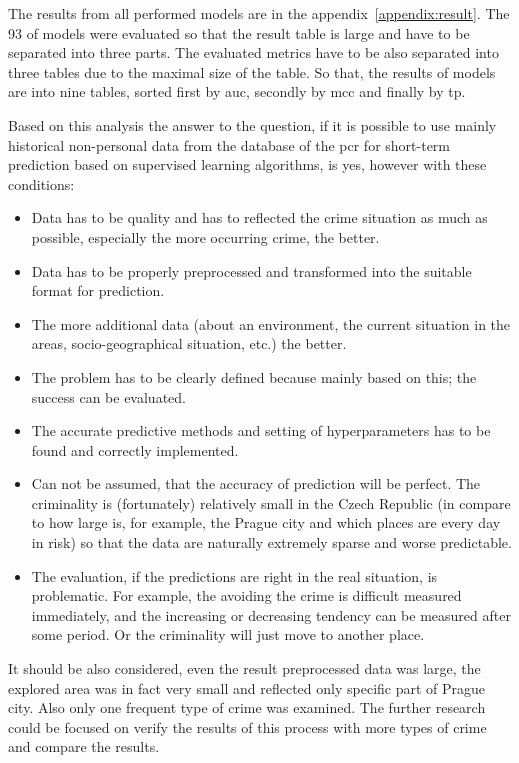 \documentclass[thesis=M,english]{FITthesis}[2012/10/20]
\begin{document}
The results from all performed models are in the appendix~\ref{appendix:result}. The 93 of models were evaluated so that the result table is large and have to be separated into three parts. The evaluated metrics have to be also separated into three tables due to the maximal size of the table. So that, the results of models are into nine tables, sorted first by \gls{auc}, secondly by \gls{mcc} and finally by \gls{tp}. 

Based on this analysis the answer to the question, if it is possible to use mainly historical non-personal data from the database of the \gls{pcr} for short-term prediction based on supervised learning algorithms, is yes, however with these conditions:

\begin{itemize}
    \item Data has to be quality and has to reflected the crime situation as much as possible, especially the more occurring crime, the better.
    \item Data has to be properly preprocessed and transformed into the suitable format for prediction.
    \item The more additional data (about an environment, the current situation in the areas, socio-geographical situation, etc.) the better.
    \item The problem has to be clearly defined because mainly based on this; the success can be evaluated.
    \item The accurate predictive methods and setting of hyperparameters has to be found and correctly implemented.
    \item Can not be assumed, that the accuracy of prediction will be perfect. The criminality is (fortunately) relatively small in the Czech Republic (in compare to how large is, for example, the Prague city and which places are every day in risk) so that the data are naturally extremely sparse and worse predictable.
    \item The evaluation, if the predictions are right in the real situation, is problematic. For example, the avoiding the crime is difficult measured immediately, and the increasing or decreasing tendency can be measured after some period. Or the criminality will just move to another place. 
\end{itemize}

It should be also considered, even the result preprocessed data was large, the explored area was in fact very small and reflected only specific part of Prague city. Also only one frequent type of crime was examined. The further research could be focused on verify the results of this process with more types of crime and compare the results. 
\end{document}
